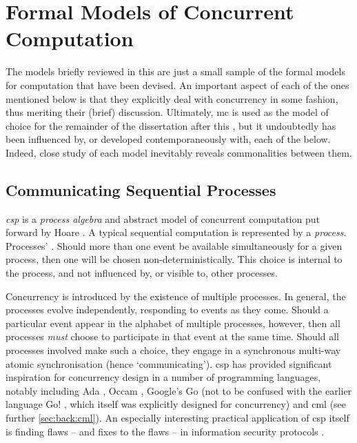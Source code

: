 \section{\label{sec:back:formalmodels}Formal Models of Concurrent Computation}
The models briefly reviewed in this  are just a small sample of the formal models for computation that have been devised.  An important aspect of each of the ones mentioned below is that they explicitly deal with concurrency in some fashion, thus meriting their (brief) discussion.  Ultimately, \gls{mc} is used as the model of choice for the remainder of the dissertation after this , but it undoubtedly has been influenced by, or developed contemporaneously with, each of the below.  Indeed, close study of each model inevitably reveals commonalities between them.

\subsection{\label{subsec:back:csp}Communicating Sequential Processes}

\emph{\Gls{csp}} is a \emph{process algebra} and abstract model of concurrent computation put forward by Hoare \cite{Hoare1985,Roscoe2011}.  A typical sequential computation is represented by a \emph{process}.  Processes' .  Should more than one event be available simultaneously for a given process, then one will be chosen non-deterministically.  This choice is internal to the process, and not influenced by, or visible to, other processes.

Concurrency is introduced by the existence of multiple processes.  In general, the processes evolve independently, responding to events as they come.  Should a particular event appear in the alphabet of multiple processes, however, then all processes \emph{must} choose to participate in that event at the same time.  Should all processes involved make such a choice, they engage in a synchronous multi-way atomic synchronisation (hence `communicating').  \gls{csp} has provided significant inspiration for concurrency design in a number of programming languages, notably including Ada \cite{Defense1983,Taft2013}, Occam \cite{Elizabeth1987}, Google's Go \cite{Meyerson2014} (not to be confused with the earlier language Go! \cite{Clark2004}, which itself was explicitly designed for concurrency) and \gls{cml} \cite{Reppy2011} (see further \vref{sec:back:cml}).  An especially interesting practical application of \gls{csp} itself is finding flaws -- and fixes to the flaws -- in information security protocols \cite{Roscoe1995,Lowe1996,Koltuksuz2010}.

